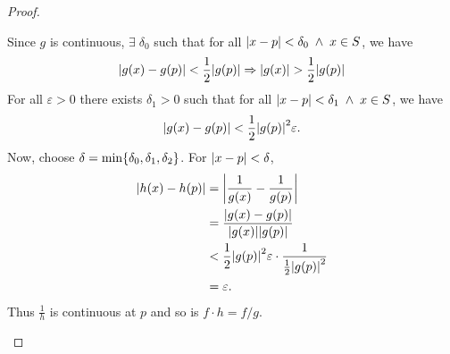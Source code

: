 \begin{proof}
\begin{enumerate}[label=(\alph*)]
        Since $g$ is continuous, $\exists\; \delta_{0}$ such that for all $\abs{x - p} < \delta_{0} \;\land\; x \in S$, we have \[
            \abs{g(x) - g(p)} < \frac{1}{2} \abs{g(p)} \implies \abs{g(x)} > \frac{1}{2} \abs{g(p)}
        \] For all $\varepsilon > 0$ there exists $\delta_{1} > 0$ such that for all $\abs{x - p} < \delta_{1} \;\land\; x \in S$, we have \[
            \abs{g(x) - g(p)} < \frac{1}{2} \abs{g(p)}^{2} \varepsilon.
        \] Now, choose $\delta = \min \set{\delta_{0},\delta_{1}, \delta_{2}}$. For $\abs{x - p} < \delta$,
        \begin{align*}
            \abs{h(x) - h(p)} &= \abs{\frac{1}{g(x)} - \frac{1}{g(p)}} \\
            &= \frac{\abs{g(x) - g(p)}}{\abs{g(x)} \abs{g(p)}} \\
            &< \frac{1}{2} \abs{g(p)}^{2} \varepsilon \cdot \frac{1}{\frac{1}{2} \abs{g(p)}^{2}} \\
            &= \varepsilon.
        \end{align*}
        Thus $\frac{1}{h}$ is continuous at $p$ and so is $f \cdot h = f / g$.
    \end{enumerate}
\end{proof}
